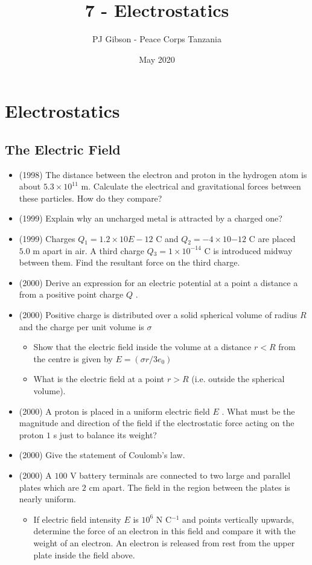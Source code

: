 \documentclass{article}
\title{\textbf{7 - Electrostatics}}
\author{PJ Gibson - Peace Corps Tanzania}
\date{May 2020}
\newcommand{\mysection}[2]{\setcounter{section}{#1}\addtocounter{section}{-1}\section{#2}}
\begin{document}
\maketitle


\mysection{7}{Electrostatics}

\subsection{The Electric Field}
\begin{itemize}
\item (1998)  The distance between the electron and proton in the hydrogen atom is about $ 5.3 \times 10^{11}$ m. Calculate the electrical and gravitational forces between these particles. How do they compare?
\item (1999)  Explain why an uncharged metal is attracted by a charged one?
\item (1999)  Charges $ Q​_{1}=1.2 \times 10$ ​$ E-12$ C and $ Q​_{2}=-4 \times 10$ ​ $ -12$ C are placed $ 5.0$ m apart in air. A third charge $ Q​_{3}=1 \times 10^{-14}$ C is introduced midway between them. Find the resultant force on the third charge.
\item (2000)  Derive an expression for an electric potential at a point a distance a from a positive point charge $ Q$ .
\item (2000)  Positive charge is distributed over a solid spherical volume of radius $ R$ and the charge per unit volume is $ \sigma $
 \begin{itemize}
\item Show that the electric field inside the volume at a distance $ r<R$ from the centre is given by $ E=(\sigma r/3e_{0})$
\item What is the electric field at a point $ r>R$ (i.e. outside the spherical volume).
\end{itemize}
\item (2000)  A proton is placed in a uniform electric field $ E$ . What must be the magnitude and direction of the field if the electrostatic force acting on the proton $ 1$ s just to balance its weight?
\item (2000)  Give the statement of Coulomb’s law.
\item (2000)  A $ 100$ V battery terminals are connected to two large and parallel plates which are $ 2$ cm apart. The field in the region between the plates is nearly uniform. 
 \begin{itemize}
\item If electric field intensity $ E$ is $ 10^{6}$ N C$ ^{-1}$ and points vertically upwards, determine the force of an electron in this field and compare it with the weight of an electron. An electron is released from rest from the upper plate inside the field above.

\end{itemize}
\end{itemize}
\end{document}
